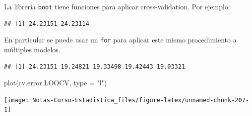 \documentclass[
  12pt,
]{book}
\newenvironment{Shaded}{\begin{snugshade}}{\end{snugshade}}
\newcommand{\AttributeTok}[1]{\textcolor[rgb]{0.77,0.63,0.00}{#1}}
\newcommand{\ControlFlowTok}[1]{\textcolor[rgb]{0.13,0.29,0.53}{\textbf{#1}}}
\newcommand{\DecValTok}[1]{\textcolor[rgb]{0.00,0.00,0.81}{#1}}
\newcommand{\FunctionTok}[1]{\textcolor[rgb]{0.00,0.00,0.00}{#1}}
\newcommand{\NormalTok}[1]{#1}
\newcommand{\OtherTok}[1]{\textcolor[rgb]{0.56,0.35,0.01}{#1}}
\newcommand{\SpecialCharTok}[1]{\textcolor[rgb]{0.00,0.00,0.00}{#1}}
\newcommand{\StringTok}[1]{\textcolor[rgb]{0.31,0.60,0.02}{#1}}
\theoremstyle{definition}
\theoremstyle{definition}
\theoremstyle{definition}
\theoremstyle{definition}
\theoremstyle{remark}
\begin{document}
La librería \texttt{boot} tiene funciones para aplicar cross-validation. Por ejemplo:

\begin{Shaded}
\end{Shaded}

\begin{verbatim}
## [1] 24.23151 24.23114
\end{verbatim}

En particular se puede usar un \texttt{for} para aplicar este mismo procedimiento a múltiples modelos.

\begin{Shaded}
\end{Shaded}

\begin{verbatim}
## [1] 24.23151 19.24821 19.33498 19.42443 19.03321
\end{verbatim}

\begin{Shaded}
\begin{Highlighting}[]
\FunctionTok{plot}\NormalTok{(cv.error.LOOCV, }\AttributeTok{type =} \StringTok{"l"}\NormalTok{)}
\end{Highlighting}
\end{Shaded}

\begin{center}\texttt{[image: Notas-Curso-Estadistica\_files/figure-latex/unnamed-chunk-207-1]} \end{center}
\end{document}
